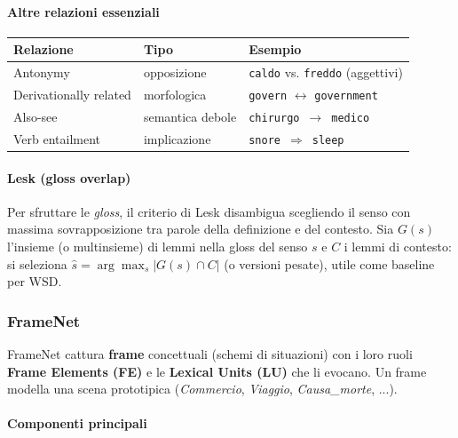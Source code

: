             \paragraph{Altre relazioni essenziali}
            \begin{center}
                \begin{tabular}{@{}lll@{}}
                    \toprule
                    \textbf{Relazione} & \textbf{Tipo} & \textbf{Esempio} \\
                    \midrule
                    Antonymy & opposizione & \texttt{caldo} vs. \texttt{freddo} (aggettivi) \\
                    Derivationally related & morfologica & \texttt{govern} $\leftrightarrow$ \texttt{government} \\
                    Also-see & semantica debole & \texttt{chirurgo} \,$\to$\, \texttt{medico} \\
                    Verb entailment & implicazione & \texttt{snore} \,$\Rightarrow$\, \texttt{sleep} \\
                    \bottomrule
                \end{tabular}
            \end{center}
            
            \paragraph{Lesk (gloss overlap)}
            Per sfruttare le \emph{gloss}, il criterio di Lesk disambigua scegliendo il senso con massima sovrapposizione tra parole della definizione e del contesto. Sia $G(s)$ l'insieme (o multinsieme) di lemmi nella gloss del senso $s$ e $C$ i lemmi di contesto: si seleziona $\hat s=\arg\max_s |G(s)\cap C|$ (o versioni pesate), utile come baseline per WSD.

        \newpage
            
        \subsubsection{FrameNet}
        
            FrameNet cattura \textbf{frame} concettuali (schemi di situazioni) con i loro ruoli \textbf{Frame Elements (FE)} e le \textbf{Lexical Units (LU)} che li evocano. Un frame modella una scena prototipica (\emph{Commercio}, \emph{Viaggio}, \emph{Causa\_morte}, ...).
            
            \paragraph{Componenti principali}
            
